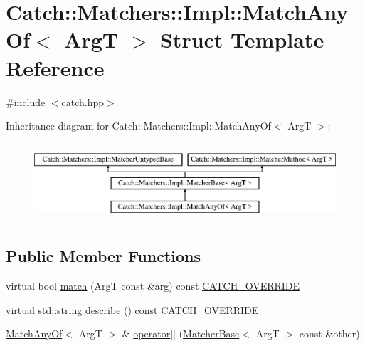 \hypertarget{struct_catch_1_1_matchers_1_1_impl_1_1_match_any_of}{}\section{Catch\+:\+:Matchers\+:\+:Impl\+:\+:Match\+Any\+Of$<$ ArgT $>$ Struct Template Reference}
\label{struct_catch_1_1_matchers_1_1_impl_1_1_match_any_of}


{\ttfamily \#include $<$catch.\+hpp$>$}

Inheritance diagram for Catch\+:\+:Matchers\+:\+:Impl\+:\+:Match\+Any\+Of$<$ ArgT $>$\+:\begin{figure}[H]
\begin{center}
\leavevmode
\includegraphics[height=2.926829cm]{struct_catch_1_1_matchers_1_1_impl_1_1_match_any_of}
\end{center}
\end{figure}
\subsection*{Public Member Functions}
\begin{DoxyCompactItemize}
\item 
virtual bool \mbox{\hyperlink{struct_catch_1_1_matchers_1_1_impl_1_1_match_any_of_a73be317ecf5919af855af96d68e714b9}{match}} (ArgT const \&arg) const \mbox{\hyperlink{catch_8hpp_a8ecdce4d3f57835f707915ae831eb847}{C\+A\+T\+C\+H\+\_\+\+O\+V\+E\+R\+R\+I\+DE}}
\item 
virtual std\+::string \mbox{\hyperlink{struct_catch_1_1_matchers_1_1_impl_1_1_match_any_of_a020f5d7889d8cd8be9ad309c690147b6}{describe}} () const \mbox{\hyperlink{catch_8hpp_a8ecdce4d3f57835f707915ae831eb847}{C\+A\+T\+C\+H\+\_\+\+O\+V\+E\+R\+R\+I\+DE}}
\item 
\mbox{\hyperlink{struct_catch_1_1_matchers_1_1_impl_1_1_match_any_of}{Match\+Any\+Of}}$<$ ArgT $>$ \& \mbox{\hyperlink{struct_catch_1_1_matchers_1_1_impl_1_1_match_any_of_a44d7582dbe09fc31b9a5ba8a6367b506}{operator$\vert$$\vert$}} (\mbox{\hyperlink{struct_catch_1_1_matchers_1_1_impl_1_1_matcher_base}{Matcher\+Base}}$<$ ArgT $>$ const \&other)
\end{DoxyCompactItemize}
